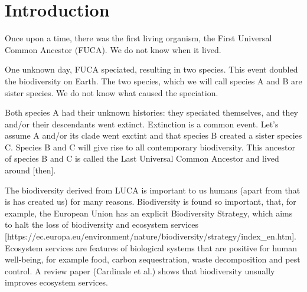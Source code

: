 \chapter{Introduction}
\label{chapter_introduction}
\newpage

\noindent

Once upon a time, there was the first living organism, the 
First Universal Common Ancestor (FUCA).
We do not know when it lived.

% 
%
%

One unknown day, FUCA speciated, resulting in two species.
This event doubled the biodiversity on Earth.
The two species, which we will call species A and B
are sister species.
We do not know what caused the speciation.

%
%

Both species A had their unknown histories: they speciated themselves,
and they and/or their descendants went extinct. 
Extinction is a common event. Let's assume A and/or its clade went
exctint and that species B created a sister species C. Species B
and C will give rise to all contemporary biodiversity. This ancestor of species B and C 
is called the Last Universal Common Ancestor and lived around [then].

            
%
%



The biodiversity derived from LUCA is important to us 
humans (apart from that is has created us) for many reasons.
Biodiversity is found so important, that, for example, 
the European Union has an explicit Biodiversity Strategy,
which aims to halt the loss of biodiversity and ecosystem services [https://ec.europa.eu/environment/nature/biodiversity/strategy/index_en.htm].
Ecosystem services are features of biological systems that are 
positive for human well-being, for example food,
carbon sequestration, waste decomposition and pest control.
A review paper (Cardinale et al.) shows that 
biodiversity unsually improves ecosystem services.

